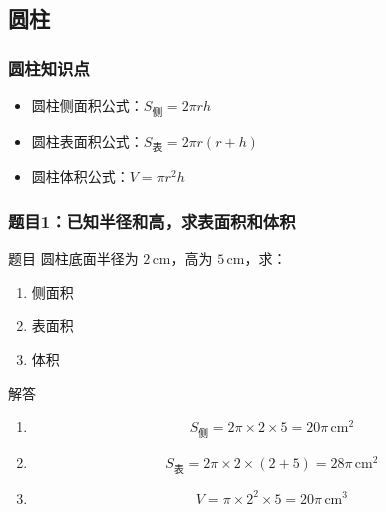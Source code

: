 
\subsection{圆柱}
\begin{frame}
    \frametitle{圆柱知识点}
    \begin{itemize}
        \item 圆柱侧面积公式：\( S_{\text{侧}} = 2\pi rh \)
        \item 圆柱表面积公式：\( S_{\text{表}} = 2\pi r(r + h) \)
        \item 圆柱体积公式：\( V = \pi r^2 h \)
    \end{itemize}
\end{frame}



\begin{frame}
    \frametitle{题目1：已知半径和高，求表面积和体积}
    \begin{block}{题目}
        圆柱底面半径为 \(2 \, \text{cm}\)，高为 \(5 \, \text{cm}\)，求：
        \begin{enumerate}
            \item 侧面积
            \item 表面积
            \item 体积
        \end{enumerate}
    \end{block}
    
    \vspace{0.5cm}
    \pause
    \begin{block}{解答}
        \begin{enumerate}
            \item
            \[
            S_{\text{侧}} = 2\pi \times 2 \times 5 = 20\pi \, \text{cm}^2
            \]
            
            \item 
            \[
            S_{\text{表}} = 2\pi \times 2 \times (2 + 5) = 28\pi \, \text{cm}^2
            \]
            
            \item 
            \[
            V = \pi \times 2^2 \times 5 = 20\pi \, \text{cm}^3
            \]
        \end{enumerate}
    \end{block}
\end{frame}




